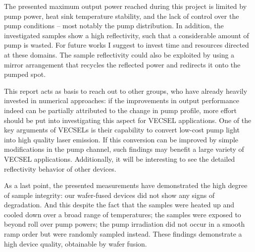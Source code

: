 The presented
maximum output power
reached during this project is
limited by pump power,
heat sink temperature stability,
and the lack of control
over the pump conditions --
most notably
the pump distribution.
In addition,
the investigated samples
show a high reflectivity,
such that a considerable amount
of pump is wasted.
For future works
I suggest to invest
time and resources
directed at these domains.
The sample reflectivity
could also be exploited
by using a mirror arrangement
that recycles
the reflected power
and redirects it
onto the pumped spot.

This report acts
as basis
to reach out
to other groups,
who have already
heavily invested
in numerical approaches:
if the improvements in output performance
indeed can be partially attributed
to the change in pump profile,
more effort
should be put into investigating
this aspect
for VECSEL applications.
One of the key arguments
of VECSELs
is their capability
to convert low-cost pump light
into high quality laser emission.
If this conversion
can be improved
by simple modifications
in the pump channel,
such findings
may benefit
a large variety of VECSEL applications.
Additionally,
it will be interesting
to see the detailed reflectivity behavior
of other devices.

As a last point,
the presented measurements
have demonstrated
the high degree
of sample integrity:
our wafer-fused devices
did not show
any signs
of degradation.
And this despite the fact
that the samples were heated up
and cooled down
over a broad range of temperatures;
the samples were exposed to
beyond roll over pump powers;
the pump irradiation
did not occur
in a smooth ramp order
but were randomly sampled
instead.
These findings
demonstrate a high device quality,
obtainable by wafer fusion.
